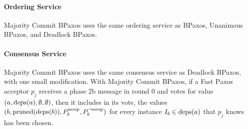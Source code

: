 \paragraph{Ordering Service}
Majority Commit BPaxos uses the same ordering service as BPaxos, Unanimous
BPaxos, and Deadlock BPaxos.

\paragraph{Consensus Service}
Majority Commit BPaxos uses the same consensus service as Deadlock BPaxos, with
one small modification. With Majority Commit BPaxos, if a Fast Paxos acceptor
$p_j$ receives a phase 2b message in round 0 and votes for value $(a, \text{deps}(a),
\emptyset, \emptyset)$, then it includes in its vote, the values $(b,
\text{pruned}(\text{deps}(b)), P^{\text{noop}}_{b}, P^{\lnot \text{noop}}_{b})$ for every instance $I_b \in
\text{deps}(a)$ that $p_j$ knows has been chosen.

